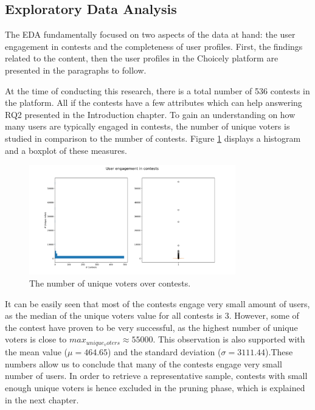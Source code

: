 \subsection{Exploratory Data Analysis}
The EDA fundamentally focused on two aspects of the data at hand: the user engagement in contests and the completeness of user profiles. First, the findings related to the content, then the user profiles in the Choicely platform are presented in the paragraphs to follow.

    At the time of conducting this research, there is a total number of 536 contests in the platform. All if the contests have a few attributes which can help answering RQ2 presented in the Introduction chapter. To gain an understanding on how many users are typically engaged in contests, the number of unique voters is studied in comparison to the number of contests. Figure \ref{user_engagement_in_contests} displays a histogram and a boxplot of these measures. 
    
    \begin{figure}[h] 
        \begin{center}
            \includegraphics[width=0.8\textwidth]{Images/user_engagement_in_contests.png}
            \caption{The number of unique voters over contests.}
            \label{user_engagement_in_contests}
        \end{center}
    \end{figure}

    It can be easily seen that most of the contests engage very small amount of users, as the median of the unique voters value for all contests is 3. However, some of the contest have proven to be very successful, as the highest number of unique voters is close to $max_{unique_voters} \approx 55 000$. This observation is also supported with the mean value ($\mu = 464.65$) and the standard deviation ($\sigma = 3111.44$).These numbers allow us to conclude that many of the contests engage very small number of users. In order to retrieve a representative sample, contests with small enough unique voters is hence excluded in the pruning phase, which is explained in the next chapter. 
    
